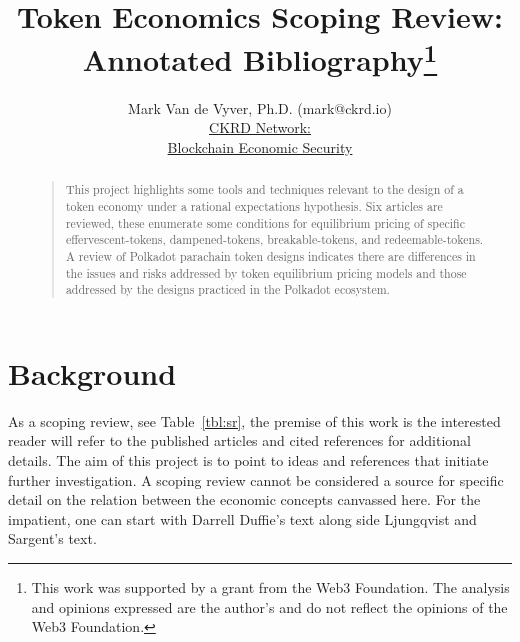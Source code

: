 \documentclass[11pt]{article}
\def \ckrdurl{https://ckrd.io/}
\begin{document}


\title{Token Economics Scoping Review:\\Annotated Bibliography\footnote{This work was supported by a grant from the Web3 Foundation. The analysis and opinions expressed are the author's and do not reflect the opinions of the Web3 Foundation.}}
\author{Mark Van de Vyver, Ph.D. (mark@ckrd.io)\\
\href{\ckrdurl}{CKRD Network:}\\
\href{\ckrdurl}{Blockchain Economic Security}\\
}
\maketitle
\begin{abstract}
\begin{quote}
This project highlights some tools and techniques relevant to the design of a token economy under a rational expectations hypothesis.  Six articles are reviewed, these enumerate some conditions for equilibrium pricing of specific effervescent-tokens, dampened-tokens, breakable-tokens, and redeemable-tokens. A review of Polkadot parachain token designs indicates there are differences in the issues and risks addressed by token equilibrium pricing models and those addressed by the designs practiced in the Polkadot ecosystem.
\end{quote}
\end{abstract}

\tableofcontents

\section{Background}

As a scoping review, see Table~\ref{tbl:sr}, the premise of this work is the interested reader will refer to the published articles and cited references for additional details.  The aim of this project is to point to ideas and references that initiate further investigation.  A scoping review cannot be considered a source for specific detail on the relation between the economic concepts canvassed here. For the impatient, one can start with Darrell Duffie's text\autocite{duffie01} along side Ljungqvist and Sargent's text\autocite{ljungqvist18}.
\end{document}
